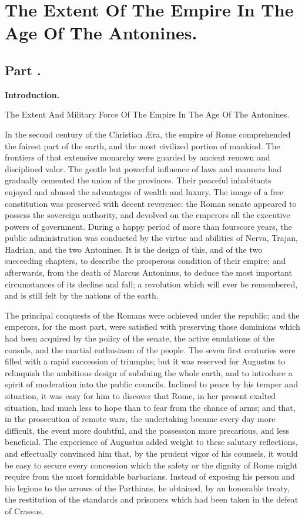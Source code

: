 \chapter{The Extent Of The Empire In The Age Of The Antonines.}
\section{Part \thesection.}
\begin{center}
\textbf{\large Introduction.}
\end{center}

The Extent And Military Force Of The Empire In The Age Of The Antonines.
\vspace{\onelineskip}

In the second century of the Christian Æra, the empire of Rome
comprehended the fairest part of the earth, and the most
civilized portion of mankind. The frontiers of that extensive
monarchy were guarded by ancient renown and disciplined valor.
The gentle but powerful influence of laws and manners had
gradually cemented the union of the provinces. Their peaceful
inhabitants enjoyed and abused the advantages of wealth and
luxury. The image of a free constitution was preserved with
decent reverence: the Roman senate appeared to possess the
sovereign authority, and devolved on the emperors all the
executive powers of government. During a happy period of more
than fourscore years, the public administration was conducted by
the virtue and abilities of Nerva, Trajan, Hadrian, and the two
Antonines. It is the design of this, and of the two succeeding
chapters, to describe the prosperous condition of their empire;
and afterwards, from the death of Marcus Antoninus, to deduce the
most important circumstances of its decline and fall; a
revolution which will ever be remembered, and is still felt by
the nations of the earth.

The principal conquests of the Romans were achieved under the
republic; and the emperors, for the most part, were satisfied
with preserving those dominions which had been acquired by the
policy of the senate, the active emulations of the consuls, and
the martial enthusiasm of the people. The seven first centuries
were filled with a rapid succession of triumphs; but it was
reserved for Augustus to relinquish the ambitious design of
subduing the whole earth, and to introduce a spirit of moderation
into the public councils. Inclined to peace by his temper and
situation, it was easy for him to discover that Rome, in her
present exalted situation, had much less to hope than to fear
from the chance of arms; and that, in the prosecution of remote
wars, the undertaking became every day more difficult, the event
more doubtful, and the possession more precarious, and less
beneficial. The experience of Augustus added weight to these
salutary reflections, and effectually convinced him that, by the
prudent vigor of his counsels, it would be easy to secure every
concession which the safety or the dignity of Rome might require
from the most formidable barbarians. Instead of exposing his
person and his legions to the arrows of the Parthians, he
obtained, by an honorable treaty, the restitution of the
standards and prisoners which had been taken in the defeat of
Crassus.\footnotemark[1]

